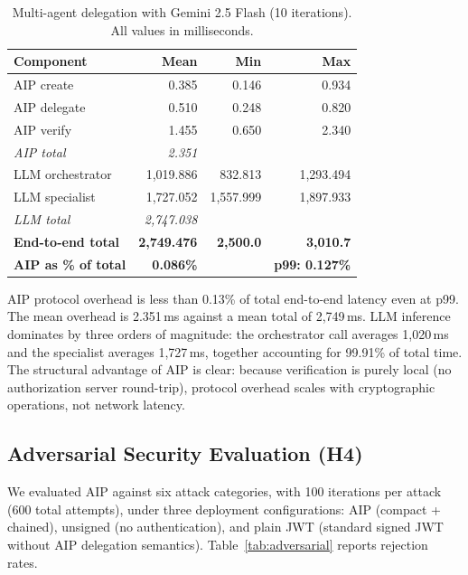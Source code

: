 \documentclass[11pt,a4paper]{article}
\newcommand{\aip}{\textsc{AIP}}
\begin{document}
\begin{table}[t]
\centering
\caption{Multi-agent delegation with Gemini 2.5 Flash (10 iterations). All values in milliseconds.}
\label{tab:real-llm}
\footnotesize
\begin{tabular}{@{}lrrr@{}}
\toprule
\textbf{Component} & \textbf{Mean} & \textbf{Min} & \textbf{Max} \\
\midrule
AIP create         &    0.385 &   0.146 &    0.934 \\
AIP delegate       &    0.510 &   0.248 &    0.820 \\
AIP verify         &    1.455 &   0.650 &    2.340 \\
\midrule
\textit{AIP total} &   \textit{2.351} &   &    \\
\midrule
LLM orchestrator   & 1,019.886 & 832.813 & 1,293.494 \\
LLM specialist     & 1,727.052 & 1,557.999 & 1,897.933 \\
\midrule
\textit{LLM total} & \textit{2,747.038} &  &  \\
\midrule
\textbf{End-to-end total} & \textbf{2,749.476} & \textbf{2,500.0} & \textbf{3,010.7} \\
\midrule
\textbf{AIP as \% of total} & \textbf{0.086\%} & & \textbf{p99: 0.127\%} \\
\bottomrule
\end{tabular}
\end{table}

\aip{} protocol overhead is less than 0.13\% of total end-to-end latency even at p99. The mean overhead is 2.351\,ms against a mean total of 2,749\,ms. LLM inference dominates by three orders of magnitude: the orchestrator call averages 1,020\,ms and the specialist averages 1,727\,ms, together accounting for 99.91\% of total time. The structural advantage of \aip{} is clear: because verification is purely local (no authorization server round-trip), protocol overhead scales with cryptographic operations, not network latency.

\subsection{Adversarial Security Evaluation (H4)}
\label{sec:adversarial}

We evaluated \aip{} against six attack categories, with 100 iterations per attack (600 total attempts), under three deployment configurations: \aip{} (compact + chained), unsigned (no authentication), and plain JWT (standard signed JWT without \aip{} delegation semantics). Table~\ref{tab:adversarial} reports rejection rates.
\end{document}
